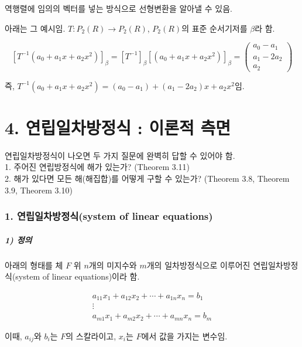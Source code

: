 역행렬에 임의의 벡터를 넣는 방식으로 선형변환을 알아낼 수 있음.

아래는 그 예시임. $T:P_2(R) \rightarrow P_2(R)$, $P_2(R)$의 표준 순서기저를 $\beta$라 함.

\[
[T^{-1}(a_0 + a_1x + a_2x^2)]_{\beta}=[T^{-1}]_{\beta}[(a_0 + a_1x + a_2x^2)]_{\beta}=
\begin{pmatrix}
a_0 - a_1\\
a_1 - 2a_2\\
a_2
\end{pmatrix}
\]

즉, $T^{-1}(a_0 + a_1x + a_2x^2)=(a_0 - a_1)+(a_1 - 2a_2)x + a_2x^2$임.


\newpage


\part*{4. 연립일차방정식 : 이론적 측면}

연립일차방정식이 나오면 두 가지 질문에 완벽히 답할 수 있어야 함.\\
1. 주어진 연립방정식에 해가 있는가? (Theorem 3.11)\\
2. 해가 있다면 모든 해(해집합)를 어떻게 구할 수 있는가? (Theorem 3.8, Theorem 3.9, Theorem 3.10)

\section*{1. 연립일차방정식(system of linear equations)}
\subsubsection*{1) 정의\\}
\begin{DEF}
아래의 형태를 체 $F$ 위 $n$개의 미지수와 $m$개의 일차방정식으로 이루어진 연립일차방정식(system of linear equations)이라 함.

\begin{gather*}
a_{11}x_{1}+a_{12}x_{2}+ \cdots + a_{1n}x_{n}=b_1 \\
\vdots \\
a_{m1}x_{1}+a_{m2}x_{2}+ \cdots + a_{mn}x_{n}=b_m
\end{gather*}

이때, $a_{ij}$와 $b_i$는 $F$의 스칼라이고, $x_i$는 $F$에서 값을 가지는 변수임.
\end{DEF}

